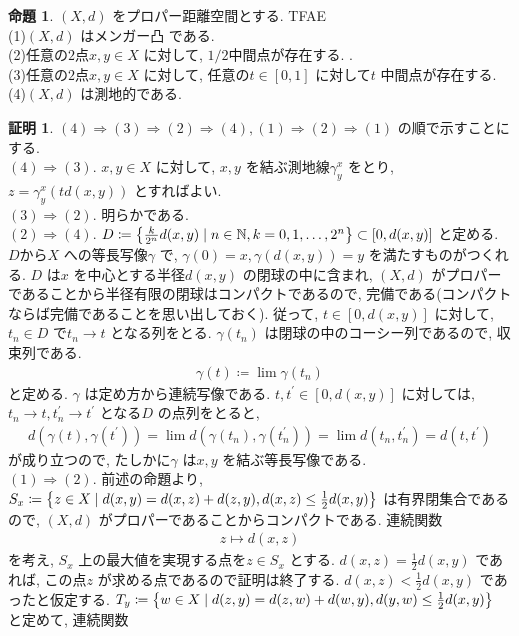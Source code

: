 \documentclass[10pt, fleqn, label-section=none]{bxjsarticle}
\theoremstyle{definition}
\newtheorem{prop}[dfn]{命題}
\newtheorem*{pf*}{証明}
\newcommand{\cbra}[1]{\mleft\{#1\mright\}}
\newcommand{\naraba}{\Rightarrow}
\renewcommand{\;}{\, ; \,}
\begin{document}
\begin{prop}$(X, d)$ をプロパー距離空間とする. TFAE\\
(1)$(X, d)$ はメンガー凸 である. \\
(2)任意の$2$点$x, y \in X$ に対して, $1/2$中間点が存在する. . \\
(3)任意の$2$点$x, y \in X$ に対して, 任意の$t \in [0, 1]$ に対して$t$ 中間点が存在する. \\
(4)$(X, d)$ は測地的である. 
\end{prop}
\begin{pf*}$(4) \naraba (3) \naraba (2) \naraba (4), (1) \naraba (2) \naraba (1)$ の順で示すことにする. \\
$(4) \naraba (3)$. $x, y \in X $ に対して, $x, y$ を結ぶ測地線$\gamma^x_y$ をとり, $z = \gamma^x_y(td(x, y))$ とすればよい. \\
$(3) \naraba (2)$. 明らかである. \\
$(2) \naraba (4)$. $D \coloneqq \cbra{\frac{k}{2^n} d(x,y) \mid n \in \mathbb N, k = 0, 1, \ldots, 2^n}   \subset  [0, d(x,y)] $ と定める. $D$から$X$ への等長写像$\gamma$ で, $\gamma (0) = x, \gamma(d(x, y)) = y$ を満たすものがつくれる. $D$ は$x$ を中心とする半径$d(x, y)$ の閉球の中に含まれ, $(X, d)$ がプロパーであることから半径有限の閉球はコンパクトであるので, 完備である(コンパクトならば完備であることを思い出しておく). 従って, $t \in [0, d(x, y)]$ に対して, $t_n \in D$ で$t_n \rightarrow t$ となる列をとる. $\gamma (t_n)$ は閉球の中のコーシー列であるので, 収束列である. 
\begin{align*} \gamma (t) \coloneqq \lim \gamma(t_n) \end{align*}  
と定める. $\gamma$ は定め方から連続写像である. $t, t^\prime \in [0, d(x,y)]$ に対しては, $t_n \rightarrow t, t^\prime_n \rightarrow t^\prime$ となる$D$ の点列をとると, 
\begin{align*} d(\gamma(t), \gamma(t^\prime)) = \lim d(\gamma (t_n), \gamma(t^\prime _n)) = \lim d(t_n, t^\prime_n) = d(t, t^\prime)\end{align*}
が成り立つので, たしかに$\gamma $ は$x, y$ を結ぶ等長写像である. \\
$(1) \naraba (2)$. 前述の命題より, $S_x \coloneqq  \cbra{z \in X  \mid d(x, y) = d(x, z) + d(z, y), d(x, z) \leq \frac{1}{2}d(x, y)}$ は有界閉集合であるので, $(X, d)$ がプロパーであることからコンパクトである. 連続関数
\begin{align*} z \mapsto d(x, z) \end{align*}
を考え, $S_x$ 上の最大値を実現する点を$z \in S_x$ とする. $d(x, z) = \frac{1}{2}d(x, y)$ であれば, この点$z$ が求める点であるので証明は終了する. $d(x, z) < \frac{1}{2}d(x, y)$ であったと仮定する. $T_y \coloneqq  \cbra{w \in X  \mid d(z, y) = d(z, w) + d(w, y), d(y, w) \leq \frac{1}{2}d(x, y)}$ と定めて, 連続関数

\end{pf*}
\end{document}
